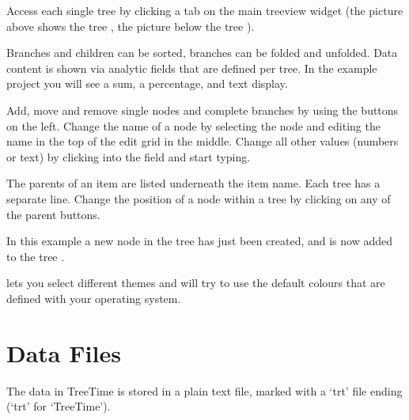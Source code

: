 \documentclass[letterpaper,10pt,english]{sphinxmanual}
\begin{document}

\sphinxAtStartPar
Access each single tree by clicking a tab on the main tree\sphinxhyphen{}view widget (the picture above shows the tree , the picture below the tree ).


\sphinxAtStartPar
Branches and children can be sorted, branches can be folded and unfolded. Data content is shown via analytic fields that are defined per tree. In the example project you will see a sum, a percentage, and text display.

\sphinxAtStartPar
Add, move and remove single nodes and complete branches by using the buttons on the left. Change the name of a node by selecting the node and editing the name in the top of the edit grid in the middle. Change all other values (numbers or text) by clicking into the field and start typing.

\sphinxAtStartPar
The parents of an item are listed underneath the item name. Each tree has a separate line. Change the position of a node within a tree by clicking on any of the parent buttons.


\sphinxAtStartPar
In this example a new node in the tree  has just been created, and is now added to the tree .

\sphinxAtStartPar
{} lets you select different themes and will try to use the default colours that are defined with your operating system.



\section{Data Files}
\label{\detokenize{introduction:data-files}}
\sphinxAtStartPar
The data in TreeTime is stored in a plain text file, marked with a ‘trt’ file ending (‘trt’ for ‘TreeTime’).
\end{document}
